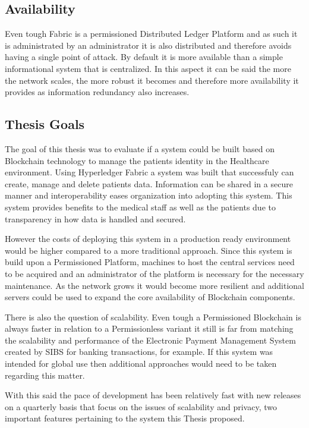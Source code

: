 \subsection{Availability}

Even tough Fabric is a permissioned Distributed Ledger Platform and as such it
is administrated by an administrator it is also distributed and therefore
avoids having a single point of attack. By default it is more available than a
simple informational system that is centralized. In this aspect it can be said
the more the network scales, the more robust it becomes and therefore more
availability it provides as information redundancy also increases.

\subsection{Thesis Goals}

The goal of this thesis was to evaluate if a system could be built based on
Blockchain technology to manage the patients identity in the Healthcare
environment. Using Hyperledger Fabric a system was built that successfuly can
create, manage and delete patients data. Information can be shared in a secure
manner and interoperability eases organization into adopting this system. This
system provides benefits to the medical staff as well as the patients due to
transparency in how data is handled and secured.

However the costs of deploying this system in a production ready environment
would be higher compared to a more traditional approach. Since this system is
build upon a Permissioned Platform, machines to host the central services need
to be acquired and an administrator of the platform is necessary for the
necessary maintenance. As the network grows it would become more resilient and
additional servers could be used to expand the core availability of Blockchain
components.

There is also the question of scalability. Even tough a Permissioned Blockchain
is always faster in relation to a Permissionless variant it still is far from
matching the scalability and performance of the Electronic Payment Management
System created by SIBS for banking transactions, for example. If this system
was intended for global use then additional approaches would need to be taken
regarding this matter.

With this said the pace of development has been relatively fast with new
releases on a quarterly basis that focus on the issues of scalability and
privacy, two important features pertaining to the system this Thesis proposed.
